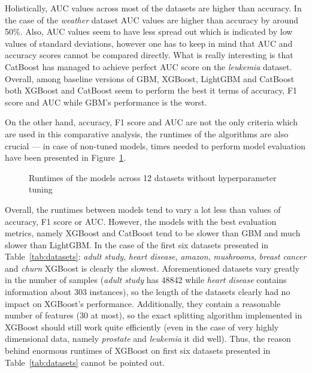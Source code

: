 \documentclass[magisterska, english]{pwr_wmat_praca_dyplomowa}
\theoremstyle{plain}
\numberwithin{theorem}{chapter}
\theoremstyle{definition}
\numberwithin{theorem}{chapter}
\begin{document}
Holistically, AUC values across most of the datasets are higher than accuracy. In the case of the \emph{weather} dataset AUC values are higher than accuracy by around 50\%. Also, AUC values seem to have less spread out which is indicated by low values of standard deviations, however one has to keep in mind that AUC and accuracy scores cannot be compared directly. What is really interesting is that CatBoost has managed to achieve perfect AUC score on the \emph{leukemia} dataset. Overall, among baseline versions of GBM, XGBoost, LightGBM and CatBoost both XGBoost and CatBoost seem to perform the best it terms of accuracy, F1 score and AUC while GBM's performance is the worst.

On the other hand, accuracy, F1 score and AUC are not the only criteria which are used in this comparative analysis, the runtimes of the algorithms are also crucial --- in case of non-tuned models, times needed to perform model evaluation have been presented in Figure~\ref{fig:no_tuning_runtimes}.

\begin{figure}[H]
	\centering
	\caption{Runtimes of the models across 12 datasets without hyperparameter tuning}
	\label{fig:no_tuning_runtimes}
\end{figure}

Overall, the runtimes between models tend to vary a lot less than values of accuracy, F1 score or AUC. However, the models with the best evaluation metrics, namely XGBoost and CatBoost tend to be slower than GBM and much slower than LightGBM. In the case of the first six datasets presented in Table~\ref{tab:datasets}: \emph{adult study}, \emph{heart disease}, \emph{amazon}, \emph{mushrooms}, \emph{breast cancer} and \emph{churn} XGBoost is clearly the slowest. Aforementioned datasets vary greatly in the number of samples (\emph{adult study} has 48842 while \emph{heart disease} contains information about 303 instances), so the length of the datasets clearly had no impact on XGBoost's performance. Additionally, they contain a reasonable number of features (30 at most), so the exact splitting algorithm implemented in XGBoost should still work quite efficiently (even in the case of very highly dimensional data, namely \emph{prostate} and \emph{leukemia} it did well). Thus, the reason behind enormous runtimes of XGBoost on first six datasets presented in Table~\ref{tab:datasets} cannot be pointed out. 
\end{document}
